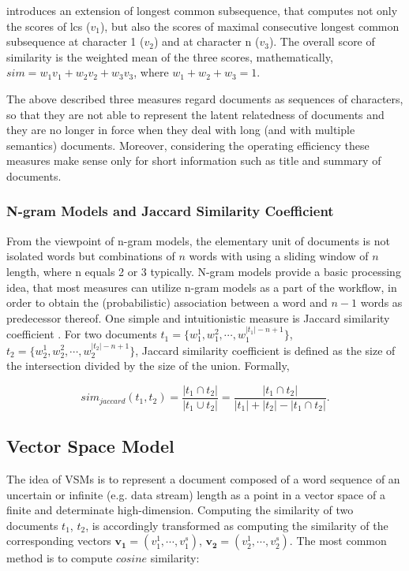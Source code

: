 \cite{islam2008semantic} introduces an extension of longest common subsequence, that computes not only the scores of lcs ($v_1$), but also the scores of maximal consecutive longest common subsequence at character 1 ($v_2$) and at character n ($v_3$). The overall score of similarity is the weighted mean of the three scores, mathematically, $sim = w_1v_1 + w_2v_2 + w_3v_3$, where $w_1 + w_2 + w_3 = 1$. 

The above described three measures regard documents as sequences of characters, so that they are not able to represent the latent relatedness of documents and they are no longer in force when they deal with long (and with multiple semantics) documents. Moreover, considering the operating efficiency these measures make sense only for short information such as title and summary of documents. 


\subsubsection{N-gram Models and Jaccard Similarity Coefficient}

From the viewpoint of n-gram models, the elementary unit of documents is not isolated words but combinations of $n$ words with using a sliding window of $n$ length, where n equals 2 or 3 typically. N-gram models provide a basic processing idea, that most measures can utilize n-gram models as a part of the workflow, in order to obtain the (probabilistic) association between a word and $n-1$ words as predecessor thereof. One simple and intuitionistic measure is Jaccard similarity coefficient \cite{bank2008calculating}. For two documents $t_1=\{w^1_1, w^2_1, \cdots, w^{|t_1|-n+1}_1\}$, $t_2=\{w^1_2, w^2_2, \cdots, w^{|t_2|-n+1}_2\}$, Jaccard similarity coefficient is defined as the size of the intersection divided by the size of the union. Formally,

\begin{equation}
    sim_{jaccard}(t_1, t_2) = \frac{|t_1 \cap t_2|}{|t_1 \cup t_2|} = \frac{|t_1 \cap t_2|}{|t_1| + |t_2| - |t_1 \cap t_2|}. 
\end{equation}


\subsection{Vector Space Model}
\label{sec:2.2}

The idea of VSMs is to represent a document composed of a word sequence of an uncertain or infinite (e.g. data stream) length as a point in a vector space of a finite and determinate high-dimension. Computing the similarity of two documents $t_1$, $t_2$, is accordingly transformed as computing the similarity of the corresponding vectors $\mathbf{v_1}=(v_1^1, \cdots, v_1^s)$, $\mathbf{v_2}=(v_2^1, \cdots, v_2^s)$. The most common method is to compute $cosine$ similarity:

